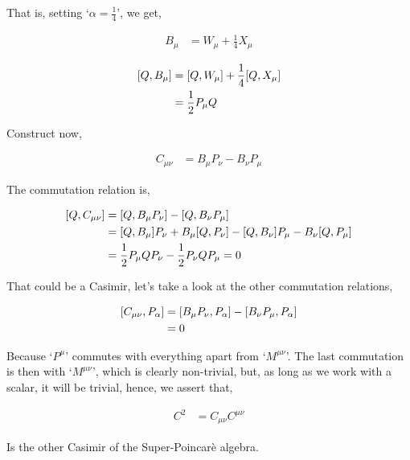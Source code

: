 That is, setting `$\alpha=\frac14$', we get,

\begin{align}
    B_\mu&=W_\mu+\frac14 X_\mu\nonumber
\end{align}

\begin{align}
    \comm{Q}{B_\mu}&=\comm{Q}{W_\mu}+\frac14\comm{Q}{X_\mu}\nonumber\\
    &=\frac12 P_\mu Q\nonumber
\end{align}

Construct now,

\begin{align}
    C_{\mu\nu}&=B_\mu P_\nu-B_\nu P_\mu\nonumber
\end{align}

The commutation relation is,

\begin{align}
    \comm{Q}{C_{\mu\nu}}&=\comm{Q}{B_\mu P_\nu}-\comm{Q}{B_\nu P_\mu}\nonumber\\
    &=\comm{Q}{B_\mu}P_\nu+B_\mu\comm{Q}{P_\nu}-\comm{Q}{B_\nu}P_\mu-B_\nu\comm{Q}{P_\mu}\nonumber\\
    &=\frac12 P_\mu Q P_\nu-\frac12P_\nu QP_\mu=0\nonumber
\end{align}

That could be a Casimir, let's take a look at the other commutation relations,

\begin{align}
    \comm{C_{\mu\nu}}{P_\alpha}&=\comm{B_\mu P_\nu}{P_\alpha}-\comm{B_\nu P_\mu}{P_\alpha}\nonumber\\
    &=0
\end{align}

Because `$P^\mu$' commutes with everything apart from `$M^{\mu\nu}$'. The last commutation is then with `$M^{\mu\nu}$', which is clearly non-trivial, but, as long as we work with a scalar, it will be trivial, hence, we assert that,

\begin{align}
    C^2&=C_{\mu\nu}C^{\mu\nu}\nonumber
\end{align}

Is the other Casimir of the Super-Poincarè algebra.